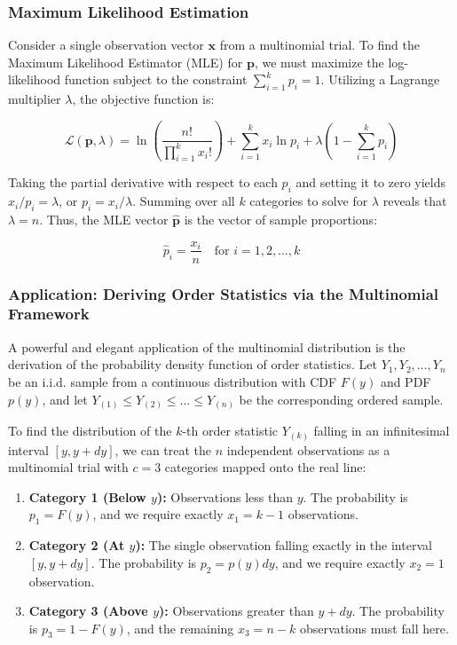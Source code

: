\subsubsection{Maximum Likelihood Estimation}
Consider a single observation vector $\mathbf{x}$ from a multinomial trial. To find the Maximum Likelihood Estimator (MLE) for $\mathbf{p}$, we must maximize the log-likelihood function subject to the constraint $\sum_{i=1}^k p_i = 1$. Utilizing a Lagrange multiplier $\lambda$, the objective function is:

	\[
	\mathcal{L}(\mathbf{p}, \lambda) = \ln\left(\frac{n!}{\prod_{i=1}^k x_i!}\right) + \sum_{i=1}^k x_i \ln p_i + \lambda \left( 1 - \sum_{i=1}^k p_i \right)
	\]
	
Taking the partial derivative with respect to each $p_i$ and setting it to zero yields $x_i / p_i = \lambda$, or $p_i = x_i / \lambda$. Summing over all $k$ categories to solve for $\lambda$ reveals that $\lambda = n$. Thus, the MLE vector $\hat{\mathbf{p}}$ is the vector of sample proportions:

	\[
	\hat{p}_i = \frac{x_i}{n} \quad \text{for } i = 1, 2, \dots, k
	\]

\subsubsection{Application: Deriving Order Statistics via the Multinomial Framework}
A powerful and elegant application of the multinomial distribution is the derivation of the probability density function of order statistics. Let $Y_1, Y_2, \dots, Y_n$ be an i.i.d. sample from a continuous distribution with CDF $F(y)$ and PDF $p(y)$, and let $Y_{(1)} \le Y_{(2)} \le \dots \le Y_{(n)}$ be the corresponding ordered sample.

To find the distribution of the $k$-th order statistic $Y_{(k)}$ falling in an infinitesimal interval $[y, y+dy]$, we can treat the $n$ independent observations as a multinomial trial with $c = 3$ categories mapped onto the real line:
\begin{enumerate}
	\item \textbf{Category 1 (Below $y$):} Observations less than $y$. The probability is $p_1 = F(y)$, and we require exactly $x_1 = k - 1$ observations.
	\item \textbf{Category 2 (At $y$):} The single observation falling exactly in the interval $[y, y+dy]$. The probability is $p_2 = p(y)dy$, and we require exactly $x_2 = 1$ observation.
	\item \textbf{Category 3 (Above $y$):} Observations greater than $y+dy$. The probability is $p_3 = 1 - F(y)$, and the remaining $x_3 = n - k$ observations must fall here.
\end{enumerate}

